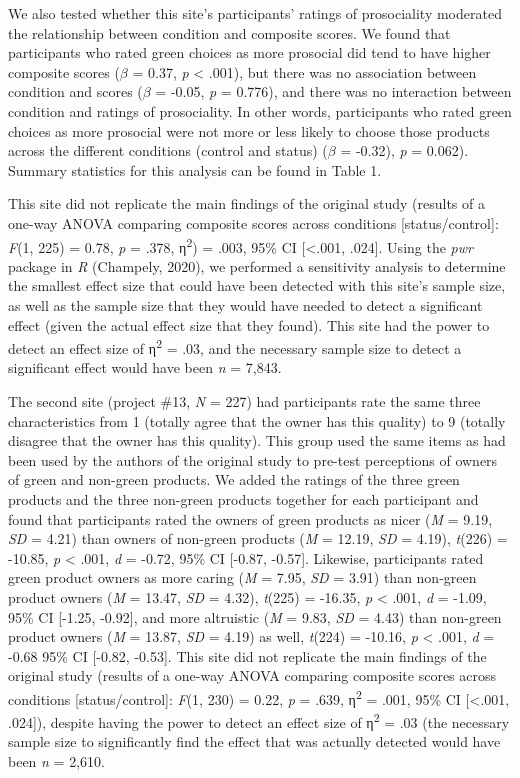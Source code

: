 \documentclass[
]{article}
\begin{document}
We also tested whether this site's participants' ratings of prosociality
moderated the relationship between condition and composite scores. We
found that participants who rated green choices as more prosocial did
tend to have higher composite scores (\(\beta\) = 0.37, \emph{p}
\textless{} .001), but there was no association between condition and
scores (\(\beta\) = -0.05, \emph{p} = 0.776), and there was no
interaction between condition and ratings of prosociality. In other
words, participants who rated green choices as more prosocial were not
more or less likely to choose those products across the different
conditions (control and status) (\(\beta\) = -0.32), \emph{p} = 0.062).
Summary statistics for this analysis can be found in Table 1.

This site did not replicate the main findings of the original study
(results of a one-way ANOVA comparing composite scores across conditions
{[}status/control{]}: \emph{F}(1, 225) = 0.78, \emph{p} = .378,
η\textsuperscript{2}) = .003, 95\% CI {[}\textless.001, .024{]}. Using
the \emph{pwr} package in \emph{R} (Champely, 2020), we performed a
sensitivity analysis to determine the smallest effect size that could
have been detected with this site's sample size, as well as the sample
size that they would have needed to detect a significant effect (given
the actual effect size that they found). This site had the power to
detect an effect size of η\textsuperscript{2} = .03, and the necessary
sample size to detect a significant effect would have been \emph{n} =
7,843.

The second site (project \#13, \emph{N} = 227) had participants rate the
same three characteristics from 1 (totally agree that the owner has this
quality) to 9 (totally disagree that the owner has this quality). This
group used the same items as had been used by the authors of the
original study to pre-test perceptions of owners of green and non-green
products. We added the ratings of the three green products and the three
non-green products together for each participant and found that
participants rated the owners of green products as nicer (\emph{M} =
9.19, \emph{SD} = 4.21) than owners of non-green products (\emph{M} =
12.19, \emph{SD} = 4.19), \emph{t}(226) = -10.85, \emph{p} \textless{}
.001, \emph{d} = -0.72, 95\% CI {[}-0.87, -0.57{]}. Likewise,
participants rated green product owners as more caring (\emph{M} = 7.95,
\emph{SD} = 3.91) than non-green product owners (\emph{M} = 13.47,
\emph{SD} = 4.32), \emph{t}(225) = -16.35, \emph{p} \textless{} .001,
\emph{d} = -1.09, 95\% CI {[}-1.25, -0.92{]}, and more altruistic
(\emph{M} = 9.83, \emph{SD} = 4.43) than non-green product owners
(\emph{M} = 13.87, \emph{SD} = 4.19) as well, \emph{t}(224) = -10.16,
\emph{p} \textless{} .001, \emph{d} = -0.68 95\% CI {[}-0.82, -0.53{]}.
This site did not replicate the main findings of the original study
(results of a one-way ANOVA comparing composite scores across conditions
{[}status/control{]}: \emph{F}(1, 230) = 0.22, \emph{p} = .639,
η\textsuperscript{2} = .001, 95\% CI {[}\textless.001, .024{]}), despite
having the power to detect an effect size of η\textsuperscript{2} = .03
(the necessary sample size to significantly find the effect that was
actually detected would have been \emph{n} = 2,610.
\end{document}
